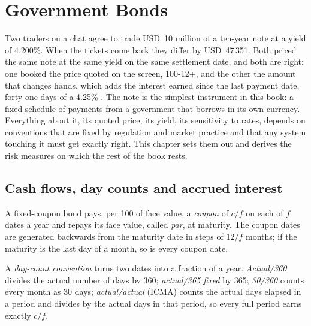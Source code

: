 \chapter{Government Bonds}\label{ch:m2:government-bonds}

Two traders on a chat agree to trade USD~10 million of a ten-year note at a
yield of 4.200\%. When the tickets come back they differ by USD~47\,351. Both
priced the same note at the same yield on the same settlement date, and both
are right: one booked the price quoted on the screen, 100-12+, and the other
the amount that changes hands, which adds the  interest earned since the
last payment date, forty-one days of a 4.25\% . The note is the simplest
instrument in this book: a fixed schedule of payments from a government that
borrows in its own currency. Everything about it, its quoted price, its
yield, its sensitivity to rates, depends on conventions that are fixed by
regulation and market practice and that any system touching it must get
exactly right. This chapter sets them out and derives the risk measures on
which the rest of the book rests.

\section{Cash flows, day counts and accrued interest}

\begin{definition}\label{def:m2:government-bonds:coupon}
A fixed-coupon bond pays, per 100 of face value, a \emph{coupon}
of $c/f$ on each of $f$ dates a year and repays its face value, called
\emph{par}, at maturity. The coupon dates are generated backwards
from the maturity date in steps of $12/f$ months; if the maturity is the last
day of a month, so is every coupon date.
\end{definition}

\begin{definition}\label{def:m2:government-bonds:daycount}
A \emph{day-count convention} turns two dates into
a fraction of a year. \emph{Actual/360} divides the actual number of days by
360; \emph{actual/365 fixed} by 365; \emph{30/360} counts every month as 30
days; \emph{actual/actual} (ICMA) counts the actual days elapsed in a 
period and divides by the actual days in that period, so every full period
earns exactly $c/f$.
\end{definition}

